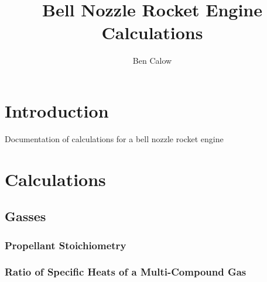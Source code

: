 \documentclass{article}
\title{Bell Nozzle Rocket Engine Calculations}
\author{Ben Calow}
\begin{document}
\clearpage\maketitle
\thispagestyle{empty}

\pagebreak

\setcounter{page}{1}

\tableofcontents

\pagebreak

\begingroup
\begin{center}
\end{center}
\endgroup

\pagebreak

\section{Introduction}

Documentation of calculations for a bell nozzle rocket engine

\pagebreak

\section{Calculations}

\subsection{Gasses}

\subsubsection{Propellant Stoichiometry}



\subsubsection{Ratio of Specific Heats of a Multi-Compound Gas}
\end{document}
